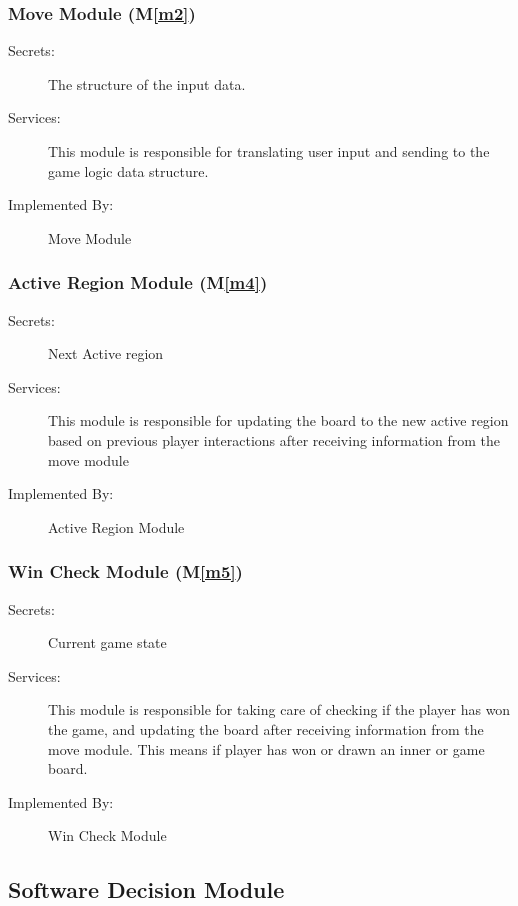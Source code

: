 \documentclass[12pt, titlepage]{article}
\newcommand{\mref}[1]{M\ref{#1}}
\begin{document}
\subsubsection{Move Module (\mref{m2})}
\begin{description}
\item[Secrets:]The structure of the input data.
\item[Services:] This module is responsible for translating user input and sending to the game logic data structure.
\item[Implemented By:] Move Module
\end{description}
\subsubsection{Active Region Module (\mref{m4})}
\begin{description}
\item[Secrets:] Next Active region
\item[Services:] This module is responsible for updating the board to the new active region based on previous player interactions after receiving information from the move module
\item[Implemented By:] Active Region Module
\end{description}

\subsubsection{Win Check Module (\mref{m5})}
\begin{description}
\item[Secrets:] Current game state
\item[Services:] This module is responsible for taking care of checking if the player has won the game, and updating the board after receiving information from the move module. This means if player has won or drawn an inner or game board.
\item[Implemented By:] Win Check Module
\end{description}

\subsection{Software Decision Module}
\end{document}
